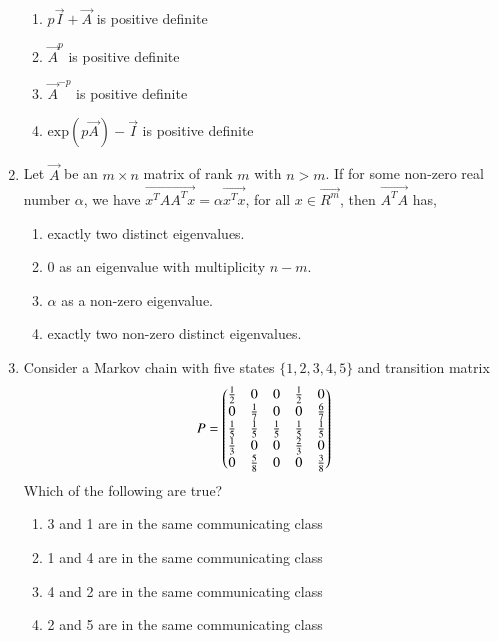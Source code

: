 \begin{enumerate}[label=\thesection.\arabic*.,ref=\thesection.\theenumi]
    \begin{enumerate}
        \item $p\vec{I}+\vec{A}$ is positive definite
        \item $\vec{A}^p$ is positive definite
        \item $\vec{A}^{-p}$ is positive definite
        \item $\text{exp}(p\vec{A})-\vec{I}$ is positive definite
        \end{enumerate}
\solution

\item Let $\vec{A}$ be an $m \times n$ matrix of rank $m$ with $n>m$. If for some non-zero real number $\alpha$, we have $\vec{x^TAA^Tx} = \alpha\vec{x^Tx}$, for all $x \in \vec{R^m}$, then $\vec{A^TA}$ has,
\begin{enumerate}

\item  exactly two distinct eigenvalues.

\item  0 as an eigenvalue with multiplicity $n-m$.

\item  $\alpha$ as a non-zero eigenvalue.

\item  exactly two non-zero distinct eigenvalues.
\end{enumerate}
%
\solution

\item %
Consider a Markov chain with five states $\{1,2,3,4,5\}$ and transition matrix
\begin{align}
    P=\begin{pmatrix}\frac{1}{2} & 0 & 0 & \frac{1}{2} & 0\\
            0 & \frac{1}{7} & 0 & 0&\frac{6}{7}\\
              \frac{1}{5} & \frac{1}{5} & \frac{1}{5} & \frac{1}{5} & \frac{1}{5}\\ \frac{1}{3} & 0 & 0 & \frac{2}{3} & 0 \\
              0 & \frac{5}{8} & 0 & 0 & \frac{3}{8}\end{pmatrix}
\end{align}
Which of the following are true?
\begin{enumerate}
\item 3 and 1 are in the same communicating class
\item 1 and 4 are in the same communicating class
\item 4 and 2 are in the same communicating class
\item 2 and 5 are in the same communicating class
\end{enumerate}
%
\solution




\end{enumerate}
